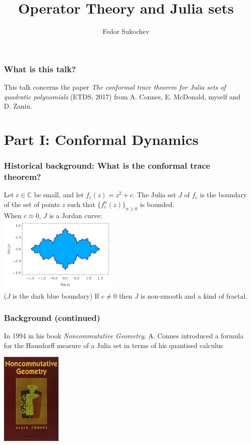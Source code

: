 \documentclass{beamer} %
\title{Operator Theory and Julia sets}
\author{Fedor Sukochev}
\institute{UNSW}
\theoremstyle{definition} %
\newcommand{\Cplx}{\mathbb{C}}
\def\qd{\,{\mathchar'26\mkern-12mu d}}
\begin{document}
\begin{frame} 
\titlepage
\end{frame}

\begin{frame}\frametitle{What is this talk?}
    This talk concerns the paper
    \emph{ The conformal trace theorem for Julia sets of quadratic polynomials}
    (ETDS, 2017) from A. Connes, E. McDonald, myself and D. Zanin.
\end{frame}



\section{Part I: Conformal Dynamics}

\begin{frame}\frametitle{Historical background: What is the conformal trace theorem?}
    Let $c \in \Cplx$ be small, and let $f_c(z) = z^2+c$. The Julia set $J$ of $f_c$ is the boundary of the set of points $z$ such that $\{f_c^n(z)\}_{n\geq 0}$ is bounded.\\
    When $c \approx 0$, $J$ is a Jordan curve:\\
    \includegraphics[width=60mm]{img/julia-07001-filled.png}\\
    ($J$ is the dark blue boundary)
    If $c \neq 0$ then $J$ is non-smooth and a kind of fractal.
\end{frame}

\begin{frame}\frametitle{Background (continued)}
    In 1994 in his book {\it Noncommutative Geometry}, A. Connes introduced a formula for the Hausdorff measure of a Julia set in terms of his quantised calculus
    \begin{center}
    \includegraphics[width=30mm]{img/ncg-book-cover.jpg}
    \end{center}
\end{frame}
\end{document}
